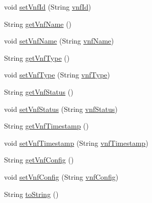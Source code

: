 \begin{DoxyCompactItemize}
\item 
void \mbox{\hyperlink{classcom_1_1example_1_1demo_1_1modular_1_1_vnf_a7ce0e8ce50ef1daae86a589b1d0f2623}{set\+Vnf\+Id}} (String \mbox{\hyperlink{classcom_1_1example_1_1demo_1_1modular_1_1_vnf_a3a636f275db30e480bef5aad900979c3}{vnf\+Id}})
\item 
String \mbox{\hyperlink{classcom_1_1example_1_1demo_1_1modular_1_1_vnf_a35d87fecb9af1aaa9c59006ea8147329}{get\+Vnf\+Name}} ()
\item 
void \mbox{\hyperlink{classcom_1_1example_1_1demo_1_1modular_1_1_vnf_a400adeb8fb5d36e9fef18051f45348aa}{set\+Vnf\+Name}} (String \mbox{\hyperlink{classcom_1_1example_1_1demo_1_1modular_1_1_vnf_a38cae2daf10c2cdf85f7518da4236f57}{vnf\+Name}})
\item 
String \mbox{\hyperlink{classcom_1_1example_1_1demo_1_1modular_1_1_vnf_ae9c1389fabbaeb8a67f9a5ec4d14ed1c}{get\+Vnf\+Type}} ()
\item 
void \mbox{\hyperlink{classcom_1_1example_1_1demo_1_1modular_1_1_vnf_a06bf639e0288288fb4f4074bbfda3e34}{set\+Vnf\+Type}} (String \mbox{\hyperlink{classcom_1_1example_1_1demo_1_1modular_1_1_vnf_aa5f7a03f548a4bc1ed654b2f4011dba1}{vnf\+Type}})
\item 
String \mbox{\hyperlink{classcom_1_1example_1_1demo_1_1modular_1_1_vnf_a4b6f16f9413e9a68fd1e453e312e62c1}{get\+Vnf\+Status}} ()
\item 
void \mbox{\hyperlink{classcom_1_1example_1_1demo_1_1modular_1_1_vnf_a81192892611adbdc7468d290ffcd1f48}{set\+Vnf\+Status}} (String \mbox{\hyperlink{classcom_1_1example_1_1demo_1_1modular_1_1_vnf_ac527b9b915a9d7ce5d8e043ef5b67ef5}{vnf\+Status}})
\item 
String \mbox{\hyperlink{classcom_1_1example_1_1demo_1_1modular_1_1_vnf_a49aef5ece60b82234ec174aaf313b7b5}{get\+Vnf\+Timestamp}} ()
\item 
void \mbox{\hyperlink{classcom_1_1example_1_1demo_1_1modular_1_1_vnf_a393d43ce627e300e87861fa657b966b3}{set\+Vnf\+Timestamp}} (String \mbox{\hyperlink{classcom_1_1example_1_1demo_1_1modular_1_1_vnf_a36bceb91ee138a8c7cf6e485cafb5183}{vnf\+Timestamp}})
\item 
String \mbox{\hyperlink{classcom_1_1example_1_1demo_1_1modular_1_1_vnf_a958d0d00d9f7f18ec3a41ee656368576}{get\+Vnf\+Config}} ()
\item 
void \mbox{\hyperlink{classcom_1_1example_1_1demo_1_1modular_1_1_vnf_a49096d27ddb5baa0e0a3675440a3f48f}{set\+Vnf\+Config}} (String \mbox{\hyperlink{classcom_1_1example_1_1demo_1_1modular_1_1_vnf_a03ea73b5ecb79146538403f79c7383bf}{vnf\+Config}})
\item 
String \mbox{\hyperlink{classcom_1_1example_1_1demo_1_1modular_1_1_vnf_a6016a9f02fa3b0d013d8114e1db4e95c}{to\+String}} ()
\end{DoxyCompactItemize}
